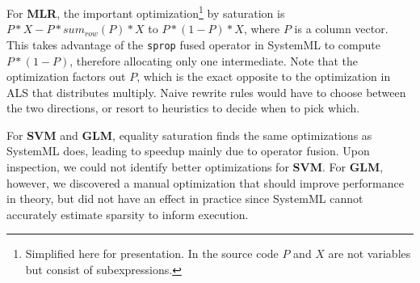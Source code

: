 For \textbf{MLR}, the important optimization\footnote{Simplified here for
  presentation. In the source code $P$ and $X$ are not variables but consist of
  subexpressions. } by saturation is $P * X - P * sum_{row}(P) * X$ to
$P*(1-P)*X$, where $P$ is a column vector. This takes advantage of the
\texttt{sprop} fused operator in SystemML to compute $P*(1-P)$, therefore
allocating only one intermediate. Note that the optimization factors out $P$, which
is the exact opposite to the optimization in ALS that distributes multiply. Naive
rewrite rules would have to choose between the two directions, or resort to
heuristics to decide when to pick which. 


For \textbf{SVM} and \textbf{GLM}, equality saturation finds the same optimizations as
SystemML does, leading to speedup mainly due to operator fusion. Upon
inspection, we could not identify better optimizations for \textbf{SVM}. For
\textbf{GLM}, however, we discovered a manual optimization that should improve
performance in theory, but did not have an effect in practice since SystemML
cannot accurately estimate sparsity to inform execution. 

